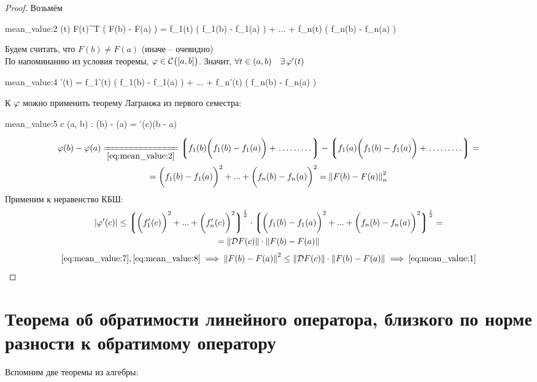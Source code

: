 \begin{proof}
	Возьмём
	\begin{equ}{mean_value:2}
		\vphi(t)  F(t)^T \bigg( F(b) - F(a) \bigg) = f_1(t) \bigg( f_1(b) - f_1(a) \bigg) + ... + f_n(t) \bigg( f_n(b) - f_n(a) \bigg)
	\end{equ}
	Будем считать, что $ F(b) \ne F(a) $ (иначе -- очевидно) \\
	По напоминанию из условия теоремы, $ \varphi \in \mathcal{C}^{} \big( {[a, b]} \big)  $. Значит, $ \forall t \in (a, b) \quad \exists\, \varphi'(t) $
	\begin{equ}{mean_value:4}
		\vphi'(t) = f_1'(t) \bigg( f_1(b) - f_1(a) \bigg) + ... + f_n'(t) \bigg( f_n(b) - f_n(a) \bigg)
	\end{equ}
	К $ \varphi $ можно применить теорему Лагранжа из первого семестра:
	\begin{equ}{mean_value:5}
		\exist c \in (a, b) : \vphi(b) - \vphi(a) = \vphi'(c)(b - a)
	\end{equ}
	\begin{multline}\lbl{mean_value:7}
		\vphi(b) - \vphi(a) \undereq{\eref{mean_value:2}} \bigg\lgroup f_1(b) \bigg(f_1(b) - f_1(a) \bigg) + \widedots[4em] \bigg\rgroup - \bigg\lgroup f_1(a) \bigg( f_1(b) - f_1(a) \bigg) + \widedots[4em] \bigg\rgroup = \\
		= \bigg( f_1(b) - f_1(a) \bigg)^2 + ... + \bigg( f_n(b) - f_n(a) \bigg)^2 = \norm{F(b) - F(a)}_n^2
	\end{multline}
	Применим к  неравенство КБШ:
	\begin{multline}\lbl{mean_value:8}
		|\vphi'(c)| \le \bigg\lgroup \bigg( f_1'(c) \bigg)^2 + ... + \bigg(f_n'(c) \bigg)^2 \bigg\rgroup^\frac12 \cdot \bigg\lgroup \bigg( f_1(b) - f_1(a) \bigg)^2 + ... + \bigg( f_n(b) - f_n(a) \bigg)^2 \bigg\rgroup^\frac12 = \\
		= \norm{\mc{D}F(c)} \cdot \norm{F(b) - F(a)}
	\end{multline}
	$$ \eref{mean_value:7}, \eref{mean_value:8} \implies \norm{F(b) - F(a)}^2 \le \norm{\mc{D}F(c)} \cdot \norm{F(b) - F(a)} \implies \eref{mean_value:1} $$
\end{proof}

\section{Теорема об обратимости линейного оператора, близкого по норме разности к обратимому оператору}

Вспомним две теоремы из алгебры:

